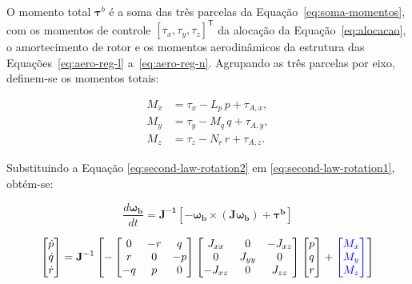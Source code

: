 {\color{blue}
O momento total $\boldsymbol{\tau}^b$ é a soma das três parcelas da Equação~\eqref{eq:soma-momentos}, com os momentos de controle $[\tau_x, \tau_y, \tau_z]^{\mathsf{T}}$ da alocação da Equação~\eqref{eq:alocacao}, o amortecimento de rotor e os momentos aerodinâmicos da estrutura das Equações~\eqref{eq:aero-reg-l} a~\eqref{eq:aero-reg-n}. Agrupando as três parcelas por eixo, definem-se os momentos totais:

\begin{align}
  M_x &= \tau_x - L_p\,p + \tau_{A,x}, \label{eq:momento-total-x} \\
  M_y &= \tau_y - M_q\,q + \tau_{A,y}, \label{eq:momento-total-y} \\
  M_z &= \tau_z - N_r\,r + \tau_{A,z}. \label{eq:momento-total-z}
\end{align}
}

Substituindo a Equação \eqref{eq:second-law-rotation2} em \eqref{eq:second-law-rotation1}, obtém-se:

\begin{equation}
  \frac{d \mathbf{\boldsymbol{\omega_b}}}{dt} = \mathbf{J^{-1}}[-\boldsymbol{\omega_b} \times (\mathbf{J} \boldsymbol{\omega_b})+\boldsymbol{\tau^b}]
  \label{eq:second-law-rotation3}
\end{equation}

\begin{equation}
  \begin{bmatrix} \dot{p} \\ \dot{q} \\ \dot{r} \end{bmatrix}
  = \mathbf{J}^{-1}\left[
  -\begin{bmatrix} 0 & -r & q \\ r & 0 & -p \\ -q & p & 0 \end{bmatrix}
  \begin{bmatrix} J_{xx} & 0 & -J_{xz} \\ 0 & J_{yy} & 0 \\ -J_{xz} & 0 & J_{zz} \end{bmatrix}
  \begin{bmatrix} p \\ q \\ r \end{bmatrix}
  + {\color{blue}\begin{bmatrix} M_x \\ M_y \\ M_z \end{bmatrix}}
  \right]
  \label{eq:rot-matricial}
  \end{equation}


